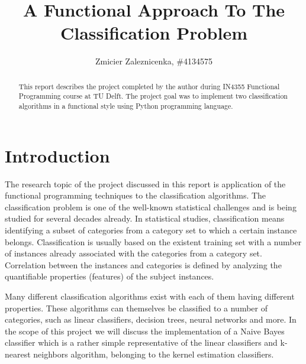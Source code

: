 \documentclass{llncs}
\begin{document}
\title{A Functional Approach To The Classification Problem}
\author{Zmicier Zaleznicenka, \#4134575}

\maketitle


\begin{abstract}
This report describes the project completed by the author during IN4355 Functional Programming course at TU Delft. The project goal was to implement two classification algorithms in a functional style using Python programming language.
\end{abstract}

\section{Introduction}

The research topic of the project discussed in this report is application of the functional programming techniques to the classification algorithms. The classification problem is one of the well-known statistical challenges and is being studied for several decades already. In statistical studies, classification means identifying a subset of categories from a category set to which a certain instance belongs. Classification is usually based on the existent training set with a number of instances already associated with the categories from a category set. Correlation between the instances and categories is defined by analyzing the quantifiable properties (features) of the subject instances\cite{WikiStatClass}.

Many different classification algorithms exist with each of them having different properties. These algorithms can themselves be classified to a number of categories, such as linear classifiers, decision trees, neural networks and more. In the scope of this project we will discuss the implementation of a Naive Bayes classifier which is a rather simple representative of the linear classifiers and k-nearest neighbors algorithm, belonging to the kernel estimation classifiers.
\end{document}
